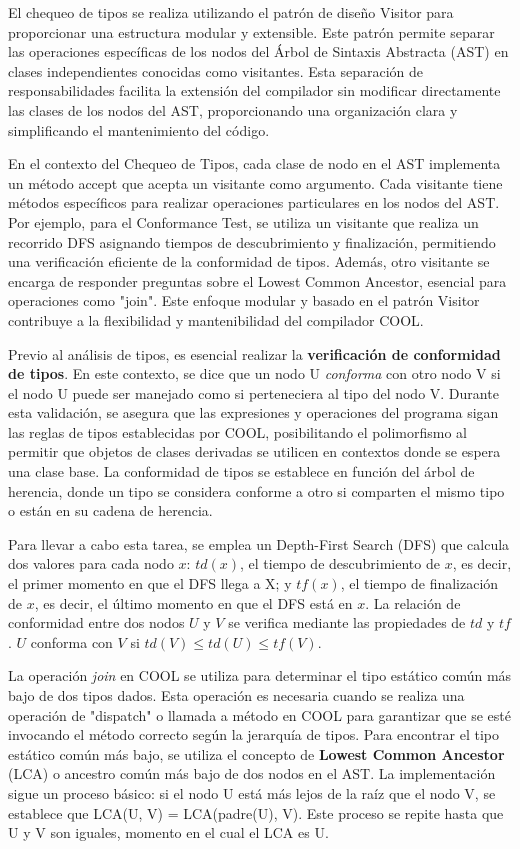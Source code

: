 \documentclass[10pt]{article} %
\begin{document}
	El chequeo de tipos se realiza utilizando el patrón de diseño Visitor para proporcionar una estructura modular y extensible. Este patrón permite separar las operaciones específicas de los nodos del Árbol de Sintaxis Abstracta (AST) en clases independientes conocidas como visitantes. Esta separación de responsabilidades facilita la extensión del compilador sin modificar directamente las clases de los nodos del AST, proporcionando una organización clara y simplificando el mantenimiento del código.
	
	En el contexto del Chequeo de Tipos, cada clase de nodo en el AST implementa un método accept que acepta un visitante como argumento. Cada visitante tiene métodos específicos para realizar operaciones particulares en los nodos del AST. Por ejemplo, para el Conformance Test, se utiliza un visitante que realiza un recorrido DFS asignando tiempos de descubrimiento y finalización, permitiendo una verificación eficiente de la conformidad de tipos. Además, otro visitante se encarga de responder preguntas sobre el Lowest Common Ancestor, esencial para operaciones como "join". Este enfoque modular y basado en el patrón Visitor contribuye a la flexibilidad y mantenibilidad del compilador COOL.
	
 	Previo al análisis de tipos, es esencial realizar la \textbf{verificación de conformidad de tipos}. En este contexto, se dice que un nodo U \textit{conforma} con otro nodo V si el nodo U puede ser manejado como si perteneciera al tipo del nodo V. Durante esta validación, se asegura que las expresiones y operaciones del programa sigan las reglas de tipos establecidas por COOL, posibilitando el polimorfismo al permitir que objetos de clases derivadas se utilicen en contextos donde se espera una clase base. La conformidad de tipos se establece en función del árbol de herencia, donde un tipo se considera conforme a otro si comparten el mismo tipo o están en su cadena de herencia. 
	
	Para llevar a cabo esta tarea, se emplea un Depth-First Search (DFS) que calcula dos valores para cada nodo $x$: $td(x)$, el tiempo de descubrimiento de $x$, es decir, el primer momento en que el DFS llega a X; y $tf(x)$, el tiempo de finalización de $x$, es decir, el último momento en que el DFS está en $x$. La relación de conformidad entre dos nodos $U$ y $V$ se verifica mediante las propiedades de $td$ y $tf$. $U$ conforma con $V$ si $td(V) \leq td(U) \leq tf(V)$.
	
	La operación \textit{join} en COOL se utiliza para determinar el tipo estático común más bajo de dos tipos dados. Esta operación es necesaria cuando se realiza una operación de "dispatch" o llamada a método en COOL para garantizar que se esté invocando el método correcto según la jerarquía de tipos. Para encontrar el tipo estático común más bajo, se utiliza el concepto de \textbf{Lowest Common Ancestor} (LCA) o ancestro común más bajo de dos nodos en el AST. La implementación sigue un proceso básico: si el nodo U está más lejos de la raíz que el nodo V, se establece que LCA(U, V) = LCA(padre(U), V). Este proceso se repite hasta que U y V son iguales, momento en el cual el LCA es U. 
	
\end{document}
